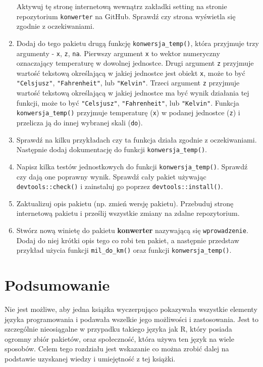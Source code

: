 \documentclass[paper=6in:9in,pagesize=pdftex,headinclude=on,footinclude=on,10pt]{scrbook}
\begin{document}
\begin{enumerate}
  Aktywuj tę stronę internetową wewnątrz zakładki setting na stronie repozytorium \texttt{konwerter} na GitHub.
  Sprawdź czy strona wyświetla się zgodnie z oczekiwaniami.
\item
  Dodaj do tego pakietu drugą funkcję \texttt{konwersja\_temp()}, która przyjmuje trzy argumenty - \texttt{x}, \texttt{z}, \texttt{na}.
  Pierwszy argument \texttt{x} to wektor numeryczny oznaczający temperaturę w dowolnej jednostce.
  Drugi argument \texttt{z} przyjmuje wartość tekstową określającą w jakiej jednostce jest obiekt \texttt{x}, może to być \texttt{"Celsjusz"}, \texttt{"Fahrenheit"}, lub \texttt{"Kelvin"}.
  Trzeci argument \texttt{z} przyjmuje wartość tekstową określającą w jakiej jednostce ma być wynik działania tej funkcji, może to być \texttt{"Celsjusz"}, \texttt{"Fahrenheit"}, lub \texttt{"Kelvin"}.
  Funkcja \texttt{konwersja\_temp()} przyjmuje temperaturę (\texttt{x}) w podanej jednostce (\texttt{z}) i przelicza ją do innej wybranej skali (\texttt{do}).
\item
  Sprawdź na kilku przykładach czy ta funkcja działa zgodnie z oczekiwaniami.
  Następnie dodaj dokumentację do funkcji \texttt{konwersja\_temp()}.
\item
  Napisz kilka testów jednostkowych do funkcji \texttt{konwersja\_temp()}.
  Sprawdź czy dają one poprawny wynik.
  Sprawdź cały pakiet używając \texttt{devtools::check()} i zainstaluj go poprzez \texttt{devtools::install()}.
\item
  Zaktualizuj opis pakietu (np. zmień wersję pakietu).
  Przebuduj stronę internetową pakietu i prześlij wszystkie zmiany na zdalne repozytorium.
\item
  Stwórz nową winietę do pakietu \textbf{konwerter} nazywającą się \texttt{wprowadzenie}.
  Dodaj do niej krótki opis tego co robi ten pakiet, a następnie przedstaw przykład użycia funkcji \texttt{mil\_do\_km()} oraz funkcji \texttt{konwersja\_temp()}.
\end{enumerate}

\hypertarget{podsumowanie}{%
\chapter{Podsumowanie}\label{podsumowanie}}

Nie jest możliwe, aby jedna książka wyczerpująco pokazywała wszystkie elementy języka programowania i podawała wszelkie jego możliwości i zastosowania.
Jest to szczególnie nieosiągalne w przypadku takiego języka jak R, który posiada ogromny zbiór pakietów, oraz społeczność, która używa ten język na wiele sposobów.
Celem tego rozdziału jest wskazanie co można zrobić dalej na podstawie uzyskanej wiedzy i umiejętność z tej książki.
\end{document}
